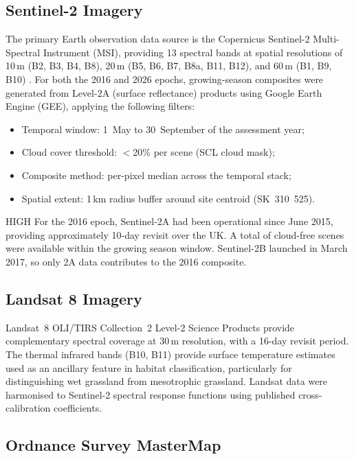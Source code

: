 \subsection{Sentinel-2 Imagery}

The primary Earth observation data source is the Copernicus Sentinel-2 Multi-Spectral Instrument (MSI), providing 13 spectral bands at spatial resolutions of 10\,m (B2, B3, B4, B8), 20\,m (B5, B6, B7, B8a, B11, B12), and 60\,m (B1, B9, B10) \citep{esa_sentinel2}. For both the 2016 and 2026 epochs, growing-season composites were generated from Level-2A (surface reflectance) products using Google Earth Engine (GEE), applying the following filters:

\begin{itemize}[nosep]
  \item Temporal window: 1~May to 30~September of the assessment year;
  \item Cloud cover threshold: $<$20\% per scene (SCL cloud mask);
  \item Composite method: per-pixel median across the temporal stack;
  \item Spatial extent: 1\,km radius buffer around site centroid (SK~310~525).
\end{itemize}

\begin{confidencebox}{HIGH}
For the 2016 epoch, Sentinel-2A had been operational since June 2015, providing approximately 10-day revisit over the UK. A total of  cloud-free scenes were available within the growing season window. Sentinel-2B launched in March 2017, so only 2A data contributes to the 2016 composite.
\end{confidencebox}

\subsection{Landsat 8 Imagery}

Landsat~8 OLI/TIRS Collection~2 Level-2 Science Products \citep{usgs_landsat8} provide complementary spectral coverage at 30\,m resolution, with a 16-day revisit period. The thermal infrared bands (B10, B11) provide surface temperature estimates used as an ancillary feature in habitat classification, particularly for distinguishing wet grassland from mesotrophic grassland. Landsat data were harmonised to Sentinel-2 spectral response functions using published cross-calibration coefficients.

\subsection{Ordnance Survey MasterMap}

